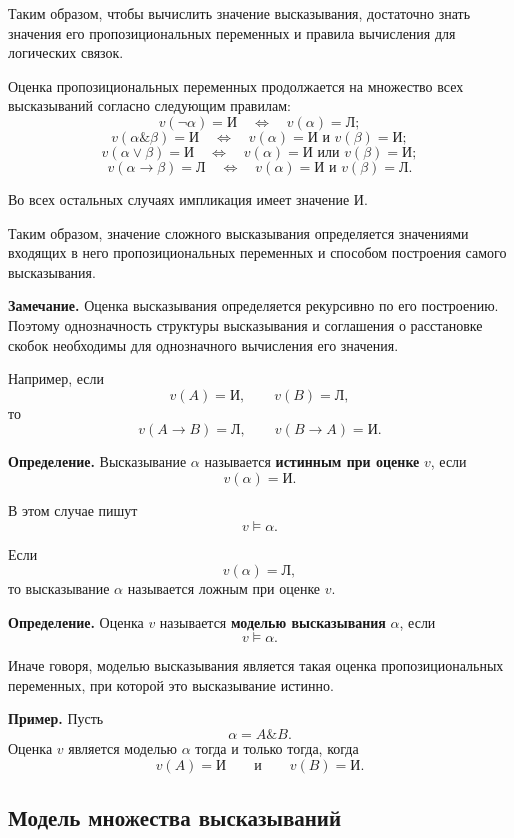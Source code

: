 \documentclass[12pt,a4paper,oneside,openany]{book}
\theoremstyle{definition}
\theoremstyle{plain}
\theoremstyle{remark}
\begin{document}
Таким образом, чтобы вычислить значение высказывания, достаточно знать значения его пропозициональных переменных и правила вычисления для логических связок.

Оценка пропозициональных переменных продолжается на множество всех
высказываний согласно следующим правилам:
\[
v(\neg\alpha)=\text{И}
\quad\Longleftrightarrow\quad
v(\alpha)=\text{Л};
\]
\[
v(\alpha\mathbin{\&}\beta)=\text{И}
\quad\Longleftrightarrow\quad
v(\alpha)=\text{И}
\text{ и }
v(\beta)=\text{И};
\]
\[
v(\alpha\lor\beta)=\text{И}
\quad\Longleftrightarrow\quad
v(\alpha)=\text{И}
\text{ или }
v(\beta)=\text{И};
\]
\[
v(\alpha\to\beta)=\text{Л}
\quad\Longleftrightarrow\quad
v(\alpha)=\text{И}
\text{ и }
v(\beta)=\text{Л}.
\]

Во всех остальных случаях импликация имеет значение \(\text{И}\).

Таким образом, значение сложного высказывания определяется значениями
входящих в него пропозициональных переменных и способом построения
самого высказывания.

\textbf{Замечание.}
Оценка высказывания определяется рекурсивно по его построению.
Поэтому однозначность структуры высказывания и соглашения о расстановке
скобок необходимы для однозначного вычисления его значения.

Например, если
\[
v(A)=\text{И},
\qquad
v(B)=\text{Л},
\]
то
\[
v(A\to B)=\text{Л},
\qquad
v(B\to A)=\text{И}.
\]


\textbf{Определение.}
Высказывание \(\alpha\) называется \textbf{истинным при оценке} \(v\),
если
\[
v(\alpha)=\text{И}.
\]

В этом случае пишут
\[
v\models\alpha.
\]

Если
\[
v(\alpha)=\text{Л},
\]
то высказывание \(\alpha\) называется ложным при оценке \(v\).

\textbf{Определение.}
Оценка \(v\) называется \textbf{моделью высказывания} \(\alpha\), если
\[
v\models\alpha.
\]

Иначе говоря, моделью высказывания является такая оценка
пропозициональных переменных, при которой это высказывание истинно.

\textbf{Пример.}
Пусть
\[
\alpha=A\mathbin{\&}B.
\]
Оценка \(v\) является моделью \(\alpha\) тогда и только тогда, когда
\[
v(A)=\text{И}
\qquad\text{и}\qquad
v(B)=\text{И}.
\]

\subsection{Модель множества высказываний}
\end{document}
